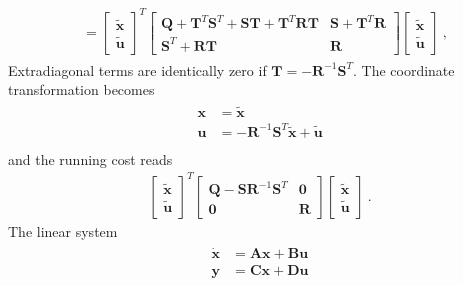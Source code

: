 \documentclass[letterpaper,10pt,english]{jupyterBook}
\begin{document}
\begin{equation*}
\begin{split}
\begin{aligned}
  & = \begin{bmatrix} \widetilde{\mathbf{x}} \\ \widetilde{\mathbf{u}} \end{bmatrix}^T \begin{bmatrix} \mathbf{Q} + \mathbf{T}^T \mathbf{S}^T + \mathbf{S} \mathbf{T} + \mathbf{T}^T \mathbf{R} \mathbf{T} & \mathbf{S} + \mathbf{T}^T \mathbf{R} \\ \mathbf{S}^T + \mathbf{R} \mathbf{T} & \mathbf{R} \end{bmatrix} \begin{bmatrix} \widetilde{\mathbf{x}} \\ \widetilde{\mathbf{u}} \end{bmatrix} \ ,
\end{aligned}\end{split}
\end{equation*}
\sphinxAtStartPar
Extra\sphinxhyphen{}diagonal terms are identically zero if \(\mathbf{T} = - \mathbf{R}^{-1} \mathbf{S}^T\). The coordinate transformation becomes
\begin{equation*}
\begin{split}\begin{aligned}
 \mathbf{x} & = \widetilde{\mathbf{x}} \\
 \mathbf{u} & = -\mathbf{R}^{-1} \mathbf{S}^T \widetilde{\mathbf{x}} + \widetilde{\mathbf{u}} \\
\end{aligned}\end{split}
\end{equation*}
\sphinxAtStartPar
and the running cost reads
\begin{equation*}
\begin{split}
  \begin{bmatrix} \widetilde{\mathbf{x}} \\ \widetilde{\mathbf{u}} \end{bmatrix}^T \begin{bmatrix} \mathbf{Q} - \mathbf{S} \mathbf{R}^{-1} \mathbf{S}^T & \mathbf{0} \\ \mathbf{0} & \mathbf{R} \end{bmatrix} \begin{bmatrix} \widetilde{\mathbf{x}} \\ \widetilde{\mathbf{u}} \end{bmatrix} \ .
\end{split}
\end{equation*}
\sphinxAtStartPar
The linear system
\begin{equation*}
\begin{split}\begin{aligned}
  \dot{\mathbf{x}} & = \mathbf{A} \mathbf{x} + \mathbf{B} \mathbf{u} \\
       \mathbf{y}  & = \mathbf{C} \mathbf{x} + \mathbf{D} \mathbf{u} \\
\end{aligned}\end{split}
\end{equation*}
\end{document}
